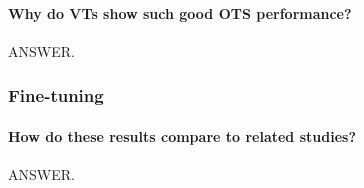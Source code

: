

\paragraph{Why do VTs show such good OTS performance?} ANSWER.

\subsubsection{Fine-tuning}

\paragraph{How do these results compare to related studies?} ANSWER.


